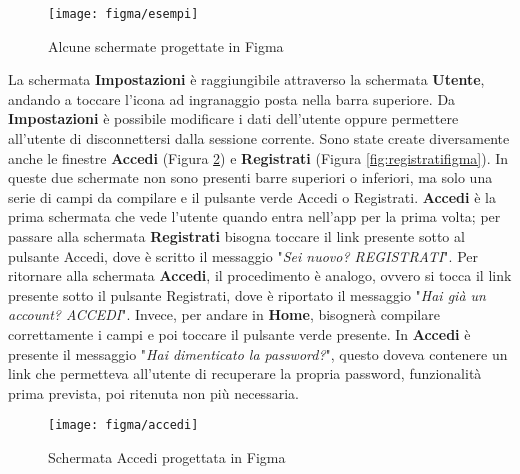 \begin{figure}[!h]
    \centering 
    \texttt{[image: figma/esempi]} 
    \caption{Alcune schermate progettate in Figma}
    \label{fig:schermatefigma}
\end{figure}
La schermata \textbf{Impostazioni} è raggiungibile attraverso la schermata \textbf{Utente}, andando a toccare l'icona ad ingranaggio posta nella barra superiore.\newline
Da \textbf{Impostazioni} è possibile modificare i dati dell'utente oppure permettere all'utente di disconnettersi dalla sessione corrente.\newline
\newline
Sono state create diversamente anche le finestre \textbf{Accedi} (Figura \ref{fig:accedifigma}) e \textbf{Registrati} (Figura \ref{fig:registratifigma}).\newline
In queste due schermate non sono presenti barre superiori o inferiori, ma solo una serie di campi da compilare e il pulsante verde Accedi o Registrati.\newline
\textbf{Accedi} è la prima schermata che vede l'utente quando entra nell'app per la prima volta; per passare alla schermata \textbf{Registrati} bisogna toccare il link presente sotto al pulsante Accedi, dove è scritto il messaggio "\emph{Sei nuovo? REGISTRATI}".\newline
Per ritornare alla schermata \textbf{Accedi}, il procedimento è analogo, ovvero si tocca il link presente sotto il pulsante Registrati, dove è riportato il messaggio "\emph{Hai già un account? ACCEDI}".\newline
Invece, per andare in \textbf{Home}, bisognerà compilare correttamente i campi e poi toccare il pulsante verde presente.\newline
\newline
In \textbf{Accedi} è presente il messaggio "\emph{Hai dimenticato la password?}", questo doveva contenere un link che permetteva all'utente di recuperare la propria password, funzionalità prima prevista, poi ritenuta non più necessaria.\newline
\begin{figure}[!h] 
    \centering 
    \texttt{[image: figma/accedi]} 
    \caption{Schermata Accedi progettata in Figma}
    \label{fig:accedifigma}
\end{figure}
